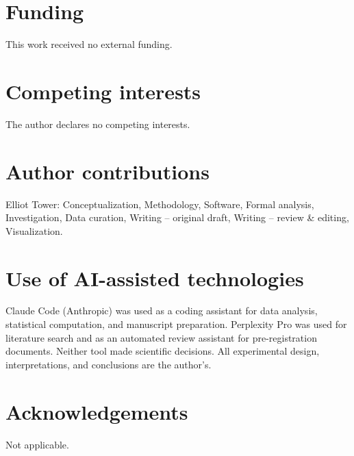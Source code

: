 \documentclass[11pt]{article}
\begin{document}
\section*{Funding}

This work received no external funding.

\section*{Competing interests}

The author declares no competing interests.

\section*{Author contributions}

Elliot Tower: Conceptualization, Methodology, Software, Formal analysis, Investigation, Data curation, Writing -- original draft, Writing -- review \& editing, Visualization.

\section*{Use of AI-assisted technologies}

Claude Code (Anthropic) was used as a coding assistant for data analysis, statistical computation, and manuscript preparation. Perplexity Pro was used for literature search and as an automated review assistant for pre-registration documents. Neither tool made scientific decisions. All experimental design, interpretations, and conclusions are the author's.

\section*{Acknowledgements}

Not applicable.



\end{document}
